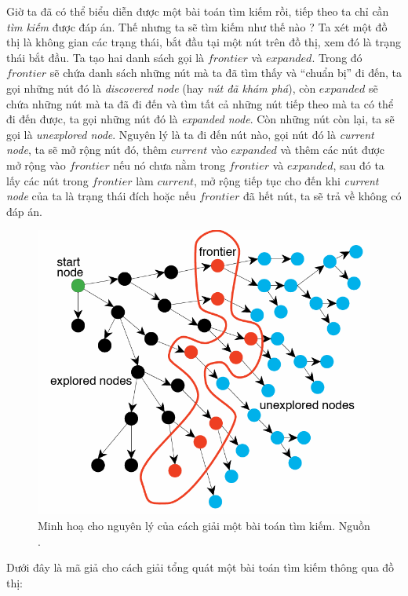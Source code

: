 Giờ ta đã có thể biểu diễn được một bài toán tìm kiếm rồi, tiếp theo ta chỉ cần \textit{tìm kiếm} được đáp án. Thế nhưng ta sẽ tìm kiếm như thế nào ? Ta xét một đồ thị là không gian các trạng thái, bắt đầu tại một nút trên đồ thị, xem đó là trạng thái bắt đầu. Ta tạo hai danh sách gọi là $frontier$ và $expanded$. Trong đó $frontier$ sẽ chứa danh sách những nút mà ta đã tìm thấy và ``chuẩn bị'' đi đến, ta gọi những nút đó là \textit{discovered node} (hay \textit{nút đã khám phá}), còn $expanded$ sẽ chứa những nút mà ta đã đi đến và tìm tất cả những nút tiếp theo mà ta có thể đi đến được, ta gọi những nút đó là \textit{expanded node}. Còn những nút còn lại, ta sẽ gọi là \textit{unexplored node}. Nguyên lý là ta đi đến nút nào, gọi nút đó là \textit{current node}, ta sẽ mở rộng nút đó, thêm $current$ vào $expanded$ và thêm các nút được mở rộng vào $frontier$ nếu nó chưa nằm trong $frontier$ và $expanded$, sau đó ta lấy các nút trong $frontier$ làm $current$, mở rộng tiếp tục cho đến khi \textit{current node} của ta là trạng thái đích hoặc nếu $frontier$ đã hết nút, ta sẽ trả về không có đáp án.

\begin{figure}[H]
    \centering
    \includegraphics[scale=0.7]{figure/illustration.png}
    \caption{Minh hoạ cho nguyên lý của cách giải một bài toán tìm kiếm. Nguồn \cite{GraphSearch}.}
    \label{fig:illu}
\end{figure}

Dưới đây là mã giả cho cách giải tổng quát một bài toán tìm kiếm thông qua đồ thị:
\vspace{10pt}

